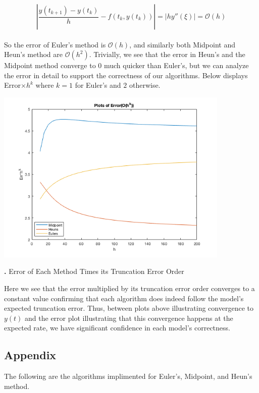 \documentclass[11.5pt]{article}
\newcommand{\abs}[1]{\left| #1 \right|}
\newcounter{graphics}
\begin{document}
$$\abs{\frac{y(t_{k+1}) - y(t_k)}{h} - f(t_k,y(t_k))} = \abs{hy''(\xi)}=\mathcal{O}(h) $$
\paragraph{}
So the error of Euler's method is $\mathcal{O}(h)$, and similarly both Midpoint and Heun's method are $\mathcal{O}(h^2)$.
Trivially, we see that the error in Heun's and the Midpoint method converge to 0 much quicker than Euler's, but we can analyze the error in detail to support the correctness of our algorithms. Below displays Error$\times h^k$ where $k = 1$ for Euler's and $2$ otherwise.
\begin{center}
\includegraphics[width = 4.4in]{Error.png}\\
\begin{scriptsize}
{\bf {}.} Error of Each Method Times its Truncation Error Order
\end{scriptsize}
\end{center}
Here we see that the error multiplied by its truncation error order converges to a constant value confirming that each algorithm does indeed follow the model's expected truncation error. Thus, between plots above illustrating convergence to $y(t)$ and the error plot illustrating that this convergence happens at the expected rate, we have significant confidence in each model's correctness.
\pagebreak
\subsection*{Appendix}
The following are the algorithms implimented for Euler's, Midpoint, and Heun's method.




\end{document}
